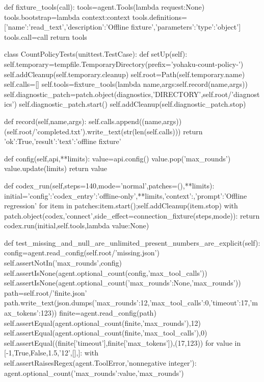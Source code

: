 def fixture_tools(call):
    tools=agent.Tools(lambda request:None)
    tools.bootstrap=lambda context:context
    tools.definitions=[{'name':'read_text','description':'Offline fixture','parameters':{'type':'object'}}]
    tools.call=call
    return tools


class CountPolicyTests(unittest.TestCase):
    def setUp(self):
        self.temporary=tempfile.TemporaryDirectory(prefix='yohaku-count-policy-')
        self.addCleanup(self.temporary.cleanup)
        self.root=Path(self.temporary.name)
        self.calls=[]
        self.tools=fixture_tools(lambda name,args:self.record(name,args))
        self.diagnostic_patch=patch.object(diagnostics,'DIRECTORY',self.root/'diagnostics')
        self.diagnostic_patch.start()
        self.addCleanup(self.diagnostic_patch.stop)

    def record(self,name,args):
        self.calls.append((name,args))
        (self.root/'completed.txt').write_text(str(len(self.calls)))
        return {'ok':True,'result':{'text':'offline fixture'}}

    def config(self,api,**limits):
        value=api.config()
        value.pop('max_rounds')
        value.update(limits)
        return value

    def codex_run(self,steps=140,mode='normal',patches=(),**limits):
        initial={'config':{'codex_entry':'offline-only',**limits},'context':{},'prompt':'Offline regression'}
        for item in patches:item.start();self.addCleanup(item.stop)
        with patch.object(codex,'connect',side_effect=connection_fixture(steps,mode)):
            return codex.run(initial,self.tools,lambda value:None)

    def test_missing_and_null_are_unlimited_present_numbers_are_explicit(self):
        config=agent.read_config(self.root/'missing.json')
        self.assertNotIn('max_rounds',config)
        self.assertIsNone(agent.optional_count(config,'max_tool_calls'))
        self.assertIsNone(agent.optional_count({'max_rounds':None},'max_rounds'))
        path=self.root/'finite.json'
        path.write_text(json.dumps({'max_rounds':12,'max_tool_calls':0,'timeout':17,'max_tokens':123}))
        finite=agent.read_config(path)
        self.assertEqual(agent.optional_count(finite,'max_rounds'),12)
        self.assertEqual(agent.optional_count(finite,'max_tool_calls'),0)
        self.assertEqual((finite['timeout'],finite['max_tokens']),(17,123))
        for value in [-1,True,False,1.5,'12',[],{}]:
            with self.assertRaisesRegex(agent.ToolError,'nonnegative integer'):
                agent.optional_count({'max_rounds':value},'max_rounds')

